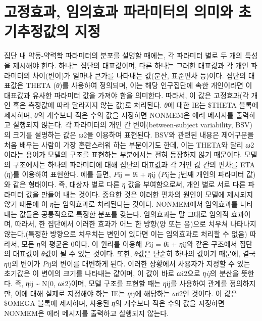 \documentclass[
  10pt,
]{krantz}
\begin{document}
\hypertarget{uxace0uxc815uxd6a8uxacfc-uxc784uxc758uxd6a8uxacfc-uxd30cuxb77cuxbbf8uxd130uxc758-uxc758uxbbf8uxc640-uxcd08uxae30uxcd94uxc815uxac12uxc758-uxc9c0uxc815}{%
\section{고정효과, 임의효과 파라미터의 의미와 초기추정값의 지정}\label{uxace0uxc815uxd6a8uxacfc-uxc784uxc758uxd6a8uxacfc-uxd30cuxb77cuxbbf8uxd130uxc758-uxc758uxbbf8uxc640-uxcd08uxae30uxcd94uxc815uxac12uxc758-uxc9c0uxc815}}

집단 내 약동-약력학 파라미터의 분포를 설명할 때에는, 각 파라미터 별로 두 개의 특성을 제시해야 한다. 하나는 집단의
대표값이며, 다른 하나는 그러한 대표값과 각 개인 파라미터의 차이(변이)가 얼마나 큰가를 나타내는 값(분산,
표준편차 등)이다. 집단의 대표값은 THETA (\emph{θ})를 사용하여 정의되며, 이는 해당 인구집단에 속한 개인이라면 이
대표값과 유사한 파라미터 값을 가져야 함을 의미한다. 따라서, 이 값은 고정효과(각 개인 혹은 측정값에 따라 달라지지 않는
값)로 처리된다. \emph{θ}에 대한 IE는 \$THETA 블록에 제시하며, \emph{θ}의 개수보다 적은 수의 값을 지정하면 NONMEM은
에러 메시지를 출력하고 실행되지 않는다. 각 파라미터의 개인 간 변이(between-subject variability,
BSV)의 크기를 설명하는 값은 \emph{ω}2을 이용하여 표현된다. BSV와 관련된 내용은 제어구문을 처음 배우는
사람이 가장 혼란스러워 하는 부분이기도 한데, 이는 THETA와 달리 \emph{ω}2이라는 용어가 모델의 구조를
표현하는 부분에서는 전혀 등장하지 않기 때문이다. 모델의 구조에서는 하나의 파라미터에 대해 집단의 대표값과 각 개인 값 간의
편차를 ETA (\emph{η})를 이용하여 표현한다. 예를 들면, \emph{P}ij = \emph{θ}i +
\emph{η}ij (\emph{P}ij는 j번째 개인의 파라미터 값)와 같은 형태이다. 즉, 대상자 별로
다른 \emph{η} 값을 부여함으로써, 개인 별로 서로 다른 파라미터 값을 만들어 내는 것이다. 중요한 것은 이러한 편차의 원인이
모델에 제시되지 않기 때문에 이 \emph{η}는 임의효과로 처리된다는 것이다. NONMEM에서 임의효과를 나타내는 값들은
공통적으로 특정한 분포를 갖는다. 임의효과는 말 그대로 임의적 효과이며, 따라서, 한 집단에서 이러한 효과가
어느 한 방향(양 또는 음)으로 치우쳐 나타나지 않는다.(특정한 방향으로 치우치는 변인이 있다면 이는 임의효과로 처리할 수
없음) 따라서, 모든 \emph{η}의 평균은 0이다. 이 원리를 이용해 \emph{P}ij = \emph{θ}i +
\emph{η}ij와 같은 구조에서 집단의 대표값이 \emph{θ}값이 될 수 있는 것이다. 또한, \emph{θ}값은 단순히 하나의
값이기 때문에, 결국 \emph{η}ij의 변이가 \emph{P}ij의 변이를 대변하게 된다. 이러한
상황에서 사용자가 지정할 수 있는 초기값은 이 변이의 크기를 나타내는 값이며, 이 값이 바로
\emph{ω}i2으로 \emph{ηij}의 분산을 뜻한다. 즉,
\emph{η}ij \textasciitilde{} N(0, \emph{ω}i2)이며, 모델 구조를 표현할 때는
\emph{η}ij를 사용하여 관계를 정의하지만, 이에 대해 실제로 지정해야 하는 IE는
\emph{η}ij에 해당하는 \emph{ω}i2인 것이다. 이 값은 \$OMEGA
블록에 제시하며, 사용된 \emph{η}의 개수보다 적은 수의 값을 지정하면 NONMEM은 에러 메시지를 출력하고 실행되지 않는다.
\end{document}
